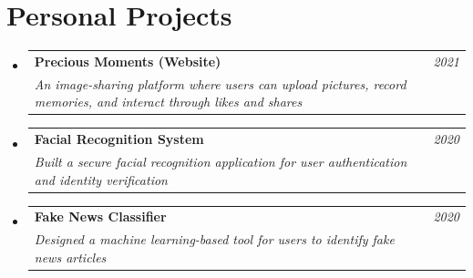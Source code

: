 \documentclass[a4paper,10pt]{article}
\makeatletter
\newcommand{\resumeProject}[4]{
\vspace{0.2mm}\item
    \begin{tabular*}{0.98\textwidth}[t]{l@{\extracolsep{\fill}}r}
        \textbf{#1} & \textit{\footnotesize{#3}} \\
        \footnotesize{\textit{#2}} & \footnotesize{#4}
    \end{tabular*}
    \vspace{-3mm}
}
\newcommand{\resumeSubHeadingListStart}{\begin{itemize}[leftmargin=*,labelsep=0mm,itemsep=0.5mm,parsep=0pt,topsep=1pt]}
\newcommand{\resumeItemListStart}{\begin{justify}\begin{itemize}[leftmargin=3ex, rightmargin=2ex, noitemsep,labelsep=1.2mm,itemsep=0mm,parsep=0pt,topsep=0pt]\small}
\newcommand{\resumeSubHeadingListEnd}{\end{itemize}\vspace{0.5mm}}
\newcommand{\resumeItemListEnd}{\end{itemize}\end{justify}\vspace{-1mm}}
\makeatother
\begin{document}
\section{\textbf{Personal Projects}}
\resumeSubHeadingListStart

    \resumeProject
      { Precious Moments (Website)} %
      {An image-sharing platform where users can upload pictures, record memories, and interact through likes and shares} %
      {2021} %
      {} %

    \vspace{-3mm}
    
    \resumeProject
      { Facial Recognition System} %
      {Built a secure facial recognition application for user authentication and identity verification} %
      {2020} %
      {} %

    \vspace{-3mm}
    
    \resumeProject
      { Fake News Classifier} %
      {Designed a machine learning-based tool for users to identify fake news articles} %
      {2020} %
      {} %

    \vspace{-3mm}
    
      
  \resumeSubHeadingListEnd
\vspace{-4mm}
\end{document}
